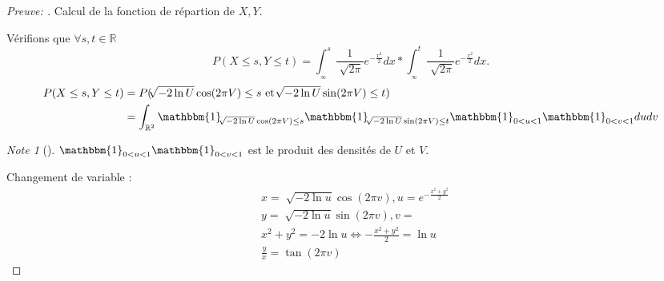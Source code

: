 \documentclass{article}
\theoremstyle{plain}%
\theoremstyle{definition}
\theoremstyle{remark}
\newtheorem*{note}{Note}
\begin{document}
\begin{proof}[Preuve: ]
	Calcul de la fonction de répartion de $ X, Y $.

	Vérifions que $ \forall s,t \in \mathbb{R} $ 
	\[
		P(X \leq s, Y \leq t) = \int_{_\infty }^{s} \frac{1}{\sqrt[]{2 \pi }} e^{- \frac{x^2}{2}} dx * \int_{_\infty }^{t} \frac{1}{\sqrt[]{2 \pi }} e^{- \frac{x^2}{2}} dx
	.\]
	\begin{align*}
		P(X \leq s, Y \leq t) &= P(\sqrt[]{-2 \ln U} \cos (2 \pi V) \leq s \text{ et  } \sqrt[]{-2 \ln U} \sin (2 \pi V) \leq t) \\
		&= \int_{\mathbb{R}^2} \mathbbm{1}_{\sqrt[]{-2 \ln U} \cos (2 \pi V) \leq s} \mathbbm{1}_{\sqrt[]{-2 \ln U} \sin (2 \pi V) \leq t} \mathbbm{1}_{0 < u < 1} \mathbbm{1}_{0 < v < 1} du dv
	\end{align*}
	\begin{note}[]
		$ \mathbbm{1}_{0 < u < 1} \mathbbm{1}_{0 < v < 1} $ est le produit des densités de $ U $ et $ V $.
	\end{note}
	Changement de variable : 
	\begin{align*}
		&x=\sqrt[]{-2 \ln u} \cos(2 \pi v), u= e^{-\frac{x^2 + y^2}{2}}\\
		&y=\sqrt[]{-2 \ln u} \sin (2 \pi v), v= \\
		&x^2 + y^2 = -2 \ln u \Leftrightarrow - \frac{x^2 + y^2}{2} = \ln u \\
		&\frac{y}{x} = \tan (2 \pi v)
	\end{align*}
	

\end{proof}
\end{document}
